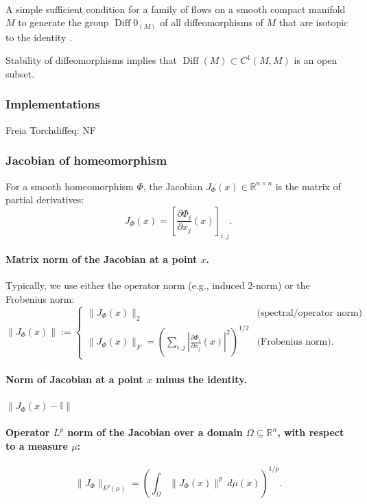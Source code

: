 \documentclass{article}
\theoremstyle{definition} \newtheorem{definition}{Definition}  \newtheorem{example}{Example}
\theoremstyle{remark} \newtheorem{remark}{Remark}
\newcommand{\Diff}{\operatorname{Diff}}
\newcounter{ct}
\begin{document}
\paragraph{}
A simple sufficient condition for a family of flows on a smooth compact manifold $M$ to generate the group $\Diff0_(M)$ of all diffeomorphisms of $M$ that are isotopic to the identity \citep{caponigro2010families}.

Stability of diffeomorphisms implies that $\Diff(M)\subset C^1(M,M)$  is an open subset.


\subsubsection{Implementations}
Freia\citep{freia} %
Torchdiffeq: \citep{torchdiffeq}
NF\citep{dinh2016density} %
\citep{stimper2023normflows} %



\subsubsection{Jacobian of homeomorphism}
 For a smooth homeomorphism \( \Phi \), the Jacobian \( J_{\Phi}(x) \in \mathbb{R}^{n \times n} \) is the matrix of partial derivatives:
\[
J_{\Phi}(x) = \left[ \frac{\partial \Phi_i}{\partial x_j}(x) \right]_{i,j}.
\]

\paragraph{Matrix norm of the Jacobian at a point \( x \).} Typically, we use either the operator norm (e.g., induced 2-norm) or the Frobenius norm:
\[
\|J_{\Phi}(x)\| :=
\begin{cases}
\|J_{\Phi}(x)\|_2 & \text{(spectral/operator norm)} \\
\|J_{\Phi}(x)\|_F = \left( \sum_{i,j} \left| \frac{\partial \Phi_i}{\partial x_j}(x) \right|^2 \right)^{1/2} & \text{(Frobenius norm)}.
\end{cases}
\]

\paragraph{Norm of Jacobian at a point \( x \) minus the identity.}
\(\|J_{\Phi}(x) - \mathbb{I}\| \)

\paragraph{Operator \( L^p \) norm of the Jacobian over a domain \( \Omega \subseteq \mathbb{R}^n \), with respect to a measure \( \mu \):}
\[
\|J_{\Phi}\|_{L^p(\mu)} = \left( \int_{\Omega} \|J_{\Phi}(x)\|^p \, d\mu(x) \right)^{1/p}.
\]
\end{document}
